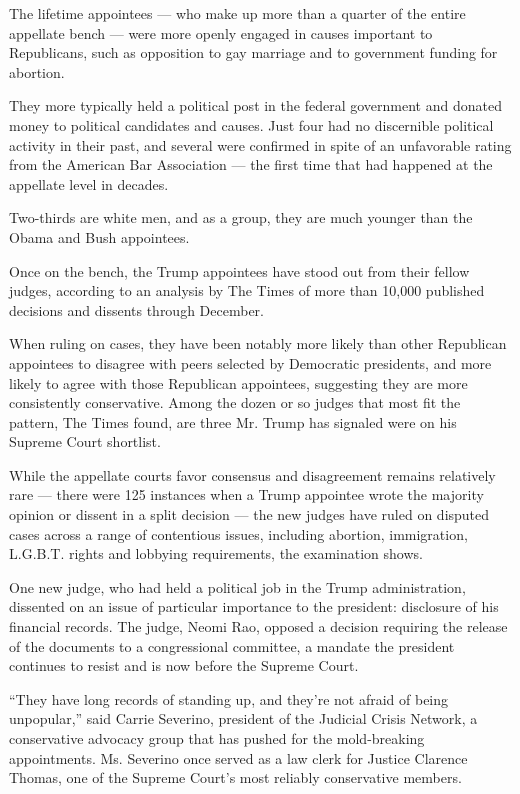 The lifetime appointees --- who make up more than a quarter of the
entire appellate bench --- were more openly engaged in causes important
to Republicans, such as opposition to gay marriage and to government
funding for abortion.

They more typically held a political post in the federal government and
donated money to political candidates and causes. Just four had no
discernible political activity in their past, and several were confirmed
in spite of an unfavorable rating from the American Bar Association ---
the first time that had happened at the appellate level in decades.

Two-thirds are white men, and as a group, they are much younger than the
Obama and Bush appointees.

Once on the bench, the Trump appointees have stood out from their fellow
judges, according to an analysis by The Times of more than 10,000
published decisions and dissents through December.

When ruling on cases, they have been notably more likely than other
Republican appointees to disagree with peers selected by Democratic
presidents, and more likely to agree with those Republican appointees,
suggesting they are more consistently conservative. Among the dozen or
so judges that most fit the pattern, The Times found, are three Mr.
Trump has signaled were on his Supreme Court shortlist.

While the appellate courts favor consensus and disagreement remains
relatively rare --- there were 125 instances when a Trump appointee
wrote the majority opinion or dissent in a split decision --- the new
judges have ruled on disputed cases across a range of contentious
issues, including abortion, immigration, L.G.B.T. rights and lobbying
requirements, the examination shows.

One new judge, who had held a political job in the Trump administration,
dissented on an issue of particular importance to the president:
disclosure of his financial records. The judge, Neomi Rao, opposed a
decision requiring the release of the documents to a congressional
committee, a mandate the president continues to resist and is now before
the Supreme Court.

``They have long records of standing up, and they're not afraid of being
unpopular,'' said Carrie Severino, president of the Judicial Crisis
Network, a conservative advocacy group that has pushed for the
mold-breaking appointments. Ms. Severino once served as a law clerk for
Justice Clarence Thomas, one of the Supreme Court's most reliably
conservative members.


